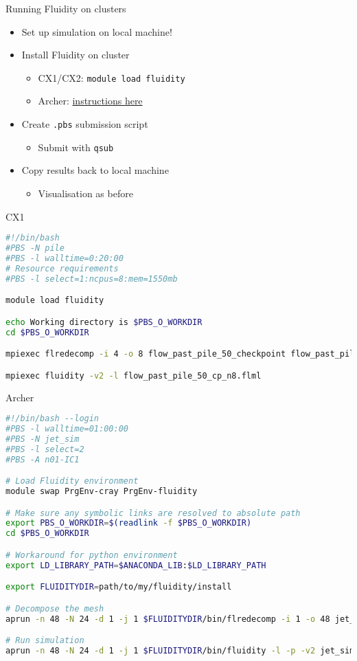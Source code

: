 \documentclass[t, hyperref={pdfpagelabels=false}]{beamer}
\begin{document}
\begin{frame}{Running Fluidity on clusters}
  \begin{itemize}
  \item Set up simulation on local machine!
    \vspace{1em}
  \item Install Fluidity on cluster
    \begin{itemize}
    \item CX1/CX2: \lstinline+module load fluidity+
    \item Archer: \href{https://github.com/FluidityProject/buildscripts/tree/master/uk/ac/archer}{instructions here}
    \end{itemize}
  \item Create \lstinline+.pbs+ submission script
    \begin{itemize}
    \item Submit with \lstinline+qsub+
    \end{itemize}
  \item Copy results back to local machine
    \begin{itemize}
    \item Visualisation as before
    \end{itemize}
  \end{itemize}
\end{frame}

\begin{frame}[fragile]{CX1}
  \begin{lstlisting}[language=bash, basicstyle=\tiny]
#!/bin/bash
#PBS -N pile
#PBS -l walltime=0:20:00
# Resource requirements
#PBS -l select=1:ncpus=8:mem=1550mb

module load fluidity

echo Working directory is $PBS_O_WORKDIR
cd $PBS_O_WORKDIR

mpiexec flredecomp -i 4 -o 8 flow_past_pile_50_checkpoint flow_past_pile_50_cp_n8

mpiexec fluidity -v2 -l flow_past_pile_50_cp_n8.flml
  \end{lstlisting}
\end{frame}

\begin{frame}[fragile]{Archer}
  \begin{lstlisting}[language=bash, basicstyle=\tiny]
#!/bin/bash --login
#PBS -l walltime=01:00:00
#PBS -N jet_sim
#PBS -l select=2
#PBS -A n01-IC1

# Load Fluidity environment
module swap PrgEnv-cray PrgEnv-fluidity

# Make sure any symbolic links are resolved to absolute path
export PBS_O_WORKDIR=$(readlink -f $PBS_O_WORKDIR)
cd $PBS_O_WORKDIR

# Workaround for python environment
export LD_LIBRARY_PATH=$ANACONDA_LIB:$LD_LIBRARY_PATH

export FLUIDITYDIR=path/to/my/fluidity/install

# Decompose the mesh
aprun -n 48 -N 24 -d 1 -j 1 $FLUIDITYDIR/bin/flredecomp -i 1 -o 48 jet_sim set_sim_48

# Run simulation
aprun -n 48 -N 24 -d 1 -j 1 $FLUIDITYDIR/bin/fluidity -l -p -v2 jet_sim_48.flml
  \end{lstlisting}
\end{frame}
\end{document}
